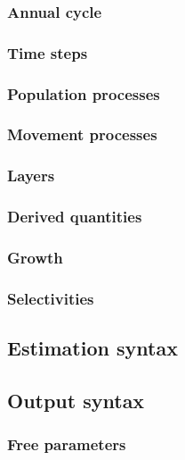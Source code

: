\subsubsection*{Annual cycle}
\subsubsection*{Time steps}
\subsubsection*{Population processes}
\subsubsection*{Movement processes}
\subsubsection*{Layers}
\subsubsection*{Derived quantities}
\subsubsection*{Growth}
\subsubsection*{Selectivities}
\subsection*{Estimation syntax\label{sec:estimation-syntax}}
\subsection*{Output syntax\label{sec:output-syntax}}
\subsubsection*{Free parameters\label{sec:InputFileFormat}}
